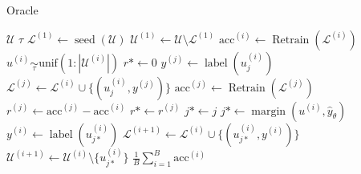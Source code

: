 \documentclass[]{article}
\begin{document}
\begin{minipage}{0.49\linewidth}
	\begin{algorithm}[H]
		\caption{Oracle}\label{alg:oracle}
		\begin{algorithmic}[1]
			\Require $\mathcal{U}$ 
			\Require $\tau$ 
			\State $\mathcal{L}^{(1)} \gets \operatorname{seed}(\mathcal{U})$  %
			\State $\mathcal{U}^{(1)} \gets \mathcal{U} \setminus \mathcal{L}^{(1)}$
			\State $\text{acc}^{(i)} \gets \operatorname{Retrain}(\mathcal{L}^{(i)})$  %
			\State $u^{(i)} \underset{\tau}{\sim} \text{unif}(1:|\mathcal{U}^{(i)}|)$
			\State $r* \gets 0$
			\State $y^{(j)} \gets \operatorname{label}(u^{(i)}_{j})$
			\State $\mathcal{L}^{(j)} \gets \mathcal{L}^{(i)} \cup \{(u^{(i)}_j, y^{(j)})\}$
			\State $\text{acc}^{(j)} \gets \operatorname{Retrain}(\mathcal{L}^{(j)})$  
			\State $r^{(j)} \gets \text{acc}^{(j)} - \text{acc}^{(i)}$
			\State $r* \gets r^{(j)}$
			\State $j* \gets j$
			\EndIf  
			\EndFor
			\State $j* \gets \operatorname{margin}(u^{(i)}, \hat y_\theta)$
			\EndIf
			\State $y^{(i)} \gets \operatorname{label}(u^{(i)}_{j*})$
			\State $\mathcal{L}^{(i+1)} \gets \mathcal{L}^{(i)} \cup \{(u^{(i)}_{j*}, y^{(i)})\}$
			\State $\mathcal{U}^{(i+1)} \gets \mathcal{U}^{(i)} \setminus \{u^{(i)}_{j*}\}$
			\EndFor
			\State
			\Return $\frac{1}{B} \sum_{i=1}^{B} \text{acc}^{(i)}$
		\end{algorithmic}
	\end{algorithm}
\end{minipage}
\hspace{3mm}
\end{document}
